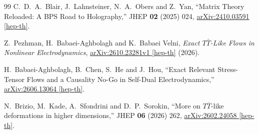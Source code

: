 \documentclass[a4paper,11pt]{ltjsreport}
\begin{document}
\begin{thebibliography}{99}
C.~D.~A.~Blair, J.~Lahnsteiner, N.~A.~Obers and Z.~Yan,
``Matrix Theory Reloaded: A BPS Road to Holography,''
JHEP \textbf{02} (2025) 024,
\href{https://arxiv.org/abs/2410.03591}{arXiv:2410.03591 [hep-th]}.

Z.~Pezhman, H.~Babaei-Aghbolagh and K.~Babaei Velni,
\emph{Exact $T\bar{T}$-Like Flows in Nonlinear Electrodynamics},
\href{https://arxiv.org/abs/2610.23281}{arXiv:2610.23281v1 [hep-th]} (2026).

H.~Babaei-Aghbolagh, B.~Chen, S.~He and J.~Hou,
``Exact Relevant Stress-Tensor Flows and a Causality No-Go in Self-Dual Electrodynamics,''
\href{https://arxiv.org/abs/2606.13064}{arXiv:2606.13064 [hep-th]}.

N.~Brizio, M.~Kade, A.~Sfondrini and D.~P.~Sorokin,
``More on $T\overline T$-like deformations in higher dimensions,''
JHEP \textbf{06} (2026) 262,
\href{https://arxiv.org/abs/2602.24058}{arXiv:2602.24058 [hep-th]}.

\end{thebibliography}
\end{document}
